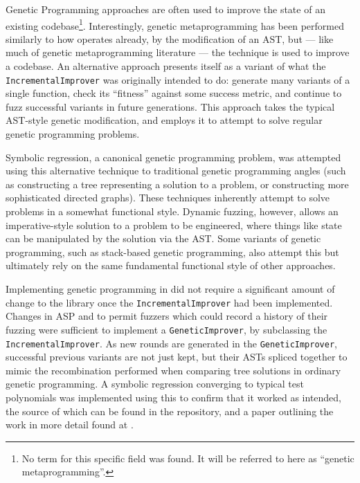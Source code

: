 \documentclass{article}
\begin{document}
Genetic Programming approaches are often used to improve the state of an
existing codebase\cite{locoGP}\footnote{No term for this
  specific field was found. It will be referred to here as ``genetic
  metaprogramming''.}. Interestingly, genetic metaprogramming has been performed
similarly to how \pdsf{} operates already, by the modification of an
AST\cite{locoGP}, but --- like much of genetic metaprogramming literature ---
the technique is used to improve a codebase. An alternative approach presents
itself as a variant of what the \texttt{IncrementalImprover} was originally
intended to do: generate many variants of a single function, check its
``fitness'' against some success metric, and continue to fuzz successful
variants in future generations. This approach takes the typical AST-style
genetic modification, and employs it to attempt to solve regular genetic
programming problems.\par

Symbolic regression, a canonical genetic programming problem, was attempted
using this alternative technique to traditional genetic programming angles (such
as constructing a tree representing a solution to a
problem\cite{koza1994genetic}, or constructing more sophisticated directed
graphs\cite{cartesian_gp}). These
techniques inherently attempt to solve problems in a somewhat functional style.
Dynamic fuzzing, however, allows an imperative-style solution to a problem to be
engineered, where things like state can be manipulated by the solution via the
AST. Some variants of genetic programming, such as stack-based genetic
programming, also attempt this\cite{stack_based_gp} but ultimately rely on the
same fundamental functional style of other approaches.\par

Implementing genetic programming in \pdsf{} did not require a significant amount
of change to the library once the \texttt{IncrementalImprover} had been
implemented. Changes in ASP and \pdsf{} to permit fuzzers which could record a
history of their fuzzing were sufficient to implement a
\texttt{GeneticImprover}, by subclassing the \texttt{IncrementalImprover}. As
new rounds are generated in the \texttt{GeneticImprover}, successful previous
variants are not just kept, but their ASTs spliced together to mimic the
recombination performed when comparing tree solutions in ordinary genetic
programming\cite{koza1994genetic}. A symbolic regression converging to typical
test polynomials was implemented using this to confirm that it worked as
intended, the source of which can be found in the \pdsf{}
repository\cite{pydysofu_repo}, and a paper outlining the work in more detail
found at \cite{realx_paper}.
\end{document}
